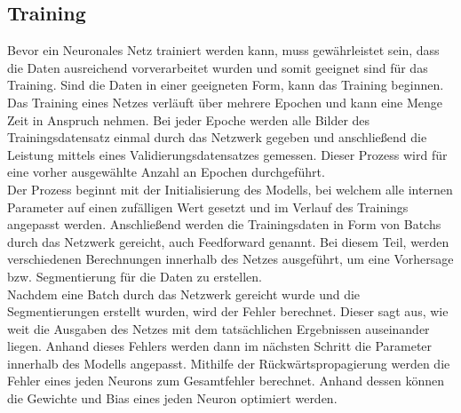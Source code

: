 \subsection{Training}
Bevor ein Neuronales Netz trainiert werden kann, muss gewährleistet sein, dass die Daten ausreichend vorverarbeitet wurden und somit geeignet sind für das Training. Sind die Daten in einer geeigneten Form, kann das Training beginnen. Das Training eines Netzes verläuft über mehrere Epochen und kann eine Menge Zeit in Anspruch nehmen. Bei jeder Epoche werden alle Bilder des Trainingsdatensatz einmal durch das Netzwerk gegeben und anschließend die Leistung mittels eines Validierungsdatensatzes gemessen. Dieser Prozess wird für eine vorher ausgewählte Anzahl an Epochen durchgeführt.\\
Der Prozess beginnt mit der Initialisierung des \gls{Modell}s, bei welchem alle internen Parameter auf einen zufälligen Wert gesetzt und im Verlauf des Trainings angepasst werden. Anschließend werden die Trainingsdaten in Form von \glspl{Batch} durch das Netzwerk gereicht, auch Feedforward genannt. Bei diesem Teil, werden verschiedenen Berechnungen innerhalb des Netzes ausgeführt, um eine Vorhersage bzw. Segmentierung für die Daten zu erstellen.\\
Nachdem eine \gls{Batch} durch das Netzwerk gereicht wurde und die Segmentierungen erstellt wurden, wird der Fehler berechnet. Dieser sagt aus, wie weit die Ausgaben des Netzes mit dem tatsächlichen Ergebnissen auseinander liegen. Anhand dieses Fehlers werden dann im nächsten Schritt die Parameter innerhalb des \gls{Modell}s angepasst. Mithilfe der Rückwärtspropagierung werden die Fehler eines jeden Neurons zum Gesamtfehler berechnet. Anhand dessen können die Gewichte und Bias eines jeden Neuron optimiert werden. \cite[vgl.][]{Goodfellow2016}